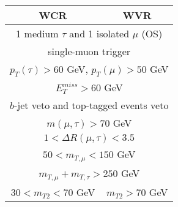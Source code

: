 %
\begin{tabular}{cc}
\hline
WCR & WVR \\ \hline \hline
\multicolumn{2}{c}{1 medium $\tau$ and 1 isolated $\mu$ (OS)} \\
\multicolumn{2}{c}{single-muon trigger} \\
\multicolumn{2}{c}{$p_T(\tau)>60$ GeV,  $p_T(\mu)>50$ GeV} \\
\multicolumn{2}{c}{$E_T^{miss} > 60$ GeV} \\
\multicolumn{2}{c}{$b$-jet veto and top-tagged events veto} \\
\multicolumn{2}{c}{$m(\mu,\tau)>70$ GeV} \\
\multicolumn{2}{c}{$1<\Delta R(\mu,\tau)<3.5$} \\
\multicolumn{2}{c}{$50<m_{T,\mu}<150$ GeV} \\
\multicolumn{2}{c}{$m_{T,\mu}+m_{T,\tau}>250$ GeV} \\
\multicolumn{1}{c|}{$30<m_{T2}<70$ GeV} & $m_{T2}>70$ GeV \\ \hline
\end{tabular}
%
%
